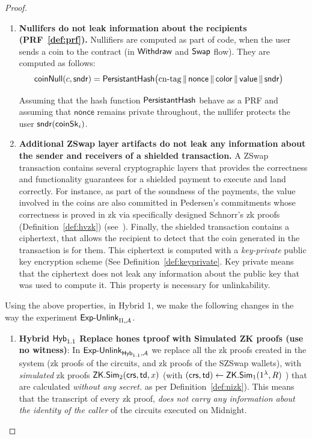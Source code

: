 \begin{proof}
\begin{enumerate}
  Assuming that the above  Midnight Commitment functions satisfy hiding when
the  $\mathsf{nonce}$ is picked at random, we can replace the recipient identity $\coinpk_i$ with the string $0$
and no adversary can detect the change.


\item\textbf{Nullifers do not leak information about the recipients (PRF~\ref{def:prf}).} Nullifiers are computed
as part of {\MidNoteT{$\opReceive$}} code,  when the user sends a coin to the contract (in $\mathsf{Withdraw}$ and $\mathsf{Swap}$ flow).
They are computed as follows:
\begin{align*}
{\mathsf{coinNull}(c, \mathsf{sndr})} &= \mathsf{PersistantHash}\bigl(\text{cn-tag} \,\|\, \mathsf{nonce} \,\|\,
  \mathsf{color} \,\|\, \mathsf{value} \,\|\, \mathsf{sndr}\bigr)
\end{align*}

Assuming that the hash function $\mathsf{PersistantHash}$ behave as a PRF and assuming that $\mathsf{nonce}$ remains private throughout, the nullifer protects the user $\mathsf{sndr} (\mathsf{coinSk}_i)$.

\item  \textbf{Additional ZSwap layer artifacts do not leak any information about the sender and receivers of a shielded transaction. }
A ZSwap transaction contains several cryptographic layers that provides the correctness and functionality guarantees for a shielded payment to execute and land correctly.
For instance, as part of the soundness of the payments,
the value involved in the coins are also committed
in Pedersen's commitments whose correctness is proved in zk via specifically designed Schnorr's zk proofs (Definition~\ref{def:hvzk}) (see~\cite{Zswap22}).
Finally, the shielded transaction contains a ciphertext, that allows the recipient to detect that the coin generated in the transaction is for them. This ciphertext is computed with a \emph{key-private}  public key encryption scheme (See Definition~\ref{def:keyprivate}. Key private means that the ciphertext does not leak any information about the public key that was used to compute it. This property is necessary for unlinkability.

\end{enumerate}


Using the above  properties,  in Hybrid 1, we make the following changes in the way the experiment  $\mathsf{Exp\text{-}Unlink}_{\Pi,\mathcal{A}}$.

\begin{enumerate}
    \item  \textbf{Hybrid $\mathsf{Hyb}_{1.1}$} \textbf{Replace hones tproof with  Simulated ZK proofs (use no witness)}:  In $\mathsf{Exp\text{-}Unlink}_{\mathsf{Hyb}_{1.1},\mathcal{A}}$ we replace all the zk proofs  created in the system (zk proofs of the circuits, and zk proofs of the SZSwap wallets),  with \emph{simulated} zk  proofs  $\mathsf{ZK.Sim}_2(\mathsf{crs},\mathsf{td},x)$  (with  $(\mathsf{crs},\mathsf{td}) \gets \mathsf{ZK.Sim}_1(1^{\lambda},R)$ ) that are calculated  \emph{without any secret.}
    as per Definition~\ref{def:nizk}).
     This means that the transcript of every zk proof, \emph{does not carry any information about the identity of the caller} of the circuits executed on Midnight.


\end{enumerate}
\end{proof}

